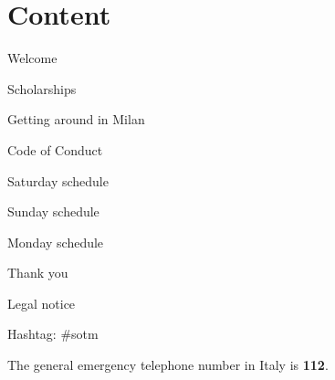 \section*{Content}

\vspace*{0.35em}%
\noindent Welcome\dotfill \pageref{welcome}

\vspace*{0.35em}%
\noindent Scholarships \dotfill \pageref{scholarships}

\vspace*{0.35em}%
\noindent Getting around in Milan\dotfill \pageref{getting-around}

\vspace*{0.35em}%
\noindent Code of Conduct \dotfill \pageref{coc}

\vspace*{0.35em}%
\noindent Saturday schedule\dotfill \pageref{saturday}

\vspace*{0.35em}%
\noindent Sunday schedule \dotfill \pageref{sunday}

\vspace*{0.35em}%
\noindent Monday schedule \dotfill \pageref{monday}

\vspace*{0.35em}%
\noindent Thank you \dotfill \pageref{thanks}

\vspace*{0.35em}%
\noindent Legal notice \dotfill \pageref{legal}

\vfill
\noindent
Hashtag: \#sotm

\vspace*{0.8em}%
\noindent
The general emergency telephone number in Italy is \textbf{112}.
\vfill

\newpage
